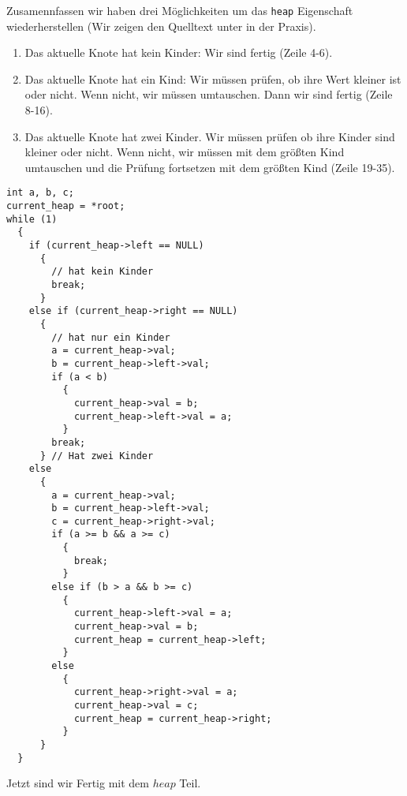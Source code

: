 Zusamennfassen wir haben drei Möglichkeiten um das \texttt{heap} Eigenschaft wiederherstellen
(Wir zeigen den Quelltext unter in der Praxis).
\begin{enumerate}
\item Das aktuelle Knote hat kein Kinder: Wir sind fertig (Zeile 4-6).
\item Das aktuelle Knote hat ein Kind: Wir müssen prüfen, ob ihre Wert kleiner ist oder nicht.
Wenn nicht, wir müssen umtauschen. Dann wir sind fertig (Zeile 8-16).
\item Das aktuelle Knote hat zwei Kinder. Wir müssen prüfen ob ihre Kinder sind kleiner oder nicht.
Wenn nicht, wir müssen mit dem größten Kind umtauschen und die Prüfung fortsetzen mit dem größten Kind (Zeile 19-35).
\end{enumerate}
\begin{lstlisting}
int a, b, c;
current_heap = *root;
while (1)
  {
    if (current_heap->left == NULL)
      {
        // hat kein Kinder
        break;
      }
    else if (current_heap->right == NULL)
      {
        // hat nur ein Kinder
        a = current_heap->val;
        b = current_heap->left->val;
        if (a < b)
          {
            current_heap->val = b;
            current_heap->left->val = a;
          }
        break;
      } // Hat zwei Kinder
    else
      {
        a = current_heap->val;
        b = current_heap->left->val;
        c = current_heap->right->val;
        if (a >= b && a >= c)
          {
            break;
          }
        else if (b > a && b >= c)
          {
            current_heap->left->val = a;
            current_heap->val = b;
            current_heap = current_heap->left;
          }
        else
          {
            current_heap->right->val = a;
            current_heap->val = c;
            current_heap = current_heap->right;
          }
      }
  }
\end{lstlisting}
Jetzt sind wir Fertig mit dem $heap$ Teil.

